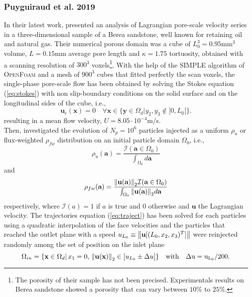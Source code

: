\subsubsection{Puyguiraud et al. 2019}
In their latest work, \citet{Puyguiraud2019} presented an analysis of Lagrangian pore-scale velocity series in a three-dimensional sample of a Berea sandstone, well known for retaining oil and natural gas.
Their numerical porous domain was a cube of $L_0^3=0.95$mm$^3$ volume, $L=0.15$mm average pore length and $\kappa=1.75$ tortuosity, obtained with a scanning resolution of $300^3$ voxels\footnote{The porosity of their sample has not been precised. Experimentals results on Berea sandstone showed a porosity that can vary between $10$\% to $25$\%.}. 
With the help of the \textsc{SIMPLE} algorithm of \textsc{OpenFoam} and a mesh of $900^3$ cubes that fitted perfectly the scan voxels, the single-phase pore-scale flow has been obtained by solving the Stokes equation (\ref{eq:stokes}) with non slip-boundary conditions on the solid surface and on the longitudinal sides of the cube, i.e., 
\begin{equation}\label{eq:nonslip_sideBC}
\textbf{u}_e(\textbf{x})=0 \quad\forall \textbf{x}\in \{\textbf{y}\in\Omega_d|y_2,y_3\notin]0,L_0[\}.
\end{equation}
resulting in a mean flow velocity, $U=8.05\cdot 10^{-4}$m/s.\\
Then, \citeauthor{Puyguiraud2019} investigated the evolution of $N_p=10^6$ particles injected as a uniform $\rho_u$ or flux-weighted $\rho_{fw}$ distribution on an initial particle domain $\Omega_0$, i.e.,
\begin{equation}\label{eq:unif_distr}
\rho_u(\textbf{a})=\frac{\mathcal{I}(\textbf{a}\in\Omega_0)}{\int_{\Omega_0} d\textbf{a}}
\end{equation}
and
\begin{equation}\label{eq:flux_weighted}
\rho_{fw}(\textbf{a})=\frac{\norm{\textbf{u}(\textbf{a})}_2\mathcal{I}(\textbf{a}\in\Omega_0)}{\int_{\Omega_0} \norm{\textbf{u}(\textbf{a})}_2 d\textbf{a}}
\end{equation}
respectively, where $\mathcal{I}(a)=1$ if $a$ is true and $0$ otherwise and $\textbf{u}$ the Lagrangian velocity. 
The trajectories equation (\ref{eq:traject}) has been solved for each particles using a quadratic interpolation of the face velocities and the particles that reached the outlet plane with a speed $u_{L_0}\equiv\norm{\textbf{u}[(L_0,x_2,x_3)^T]}$ were reinjected randomly among the set of position on the inlet plane
\[
\Omega_{in}=\{\textbf{x}\in\Omega_d|\,x_1=0,\,\norm{\textbf{u}(\textbf{x})}_2\in[u_{L_0}\pm\Delta u]\}\quad\rm{with}\quad \Delta u=u_{L_0}/200.
\]

